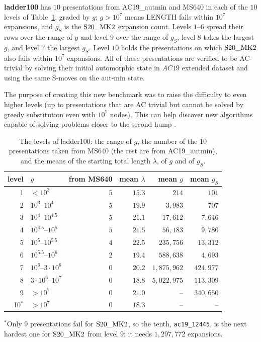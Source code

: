 \begin{definition}[ladder100]\label{def:ladder}\label{def:levels}
\textbf{ladder100} has $10$ presentations from AC19\_autmin and MS640 in each of the $10$ levels of Table~\ref{tab:ladder}, graded by $g$; $g>10^7$ means LENGTH fails within $10^7$ expansions, and $g_S$ is the $\mathrm{S20\_MK2}$
expansion count. Levels $1$--$6$ spread their rows over the range of $g$ and level $9$ over the range of $g_S$, level $8$ takes the
largest $g$, and level $7$ the largest $g_S$. Level $10$ holds the presentations on which $\mathrm{S20\_MK2}$ also fails within $10^7$ expansions. All of these presentations are verified to be AC-trivial by solving their initial automorphic state in $AC19$ extended dataset and using the same S-moves on the aut-min state.

The purpose of creating this new benchmark was to raise the difficulty to even higher levels (up to presentations that are AC trivial but cannot be solved by greedy substitution even with $10^{7}$ nodes). This can help discover new algorithms capable of solving problems closer to the second hump \cite{FTS26}.

\end{definition}

\begin{table}[ht]
\centering
\begin{tabular}{rlrrrr}
\toprule
level & $g$ & from MS640 & mean $\lambda$ & mean $g$ & mean $g_S$\\
\midrule
1 & $<10^3$ & $5$ & $15.3$ & $214$ & $101$\\
2 & $10^3$--$10^4$ & $5$ & $19.9$ & $3{,}983$ & $707$\\
3 & $10^4$--$10^{4.5}$ & $5$ & $21.1$ & $17{,}612$ & $7{,}646$\\
4 & $10^{4.5}$--$10^5$ & $5$ & $21.5$ & $56{,}183$ & $9{,}780$\\
5 & $10^5$--$10^{5.5}$ & $4$ & $22.5$ & $235{,}756$ & $13{,}312$\\
6 & $10^{5.5}$--$10^6$ & $2$ & $19.4$ & $588{,}638$ & $4{,}693$\\
7 & $10^6$--$3\cdot10^6$ & $0$ & $20.2$ & $1{,}875{,}962$ & $424{,}977$\\
8 & $3\cdot10^6$--$10^7$ & $0$ & $18.8$ & $5{,}022{,}975$ & $113{,}309$\\
9 & $>10^7$ & $0$ & $21.0$ & -- & $340{,}650$\\
10$^{*}$ & $>10^7$ & $0$ & $18.3$ & -- & --\\
\bottomrule
\end{tabular}

\smallskip
{\small $^{*}$Only $9$ presentations fail for $\mathrm{S20\_MK2}$, so the tenth, \texttt{ac19\_12445}, is the next hardest one for
$\mathrm{S20\_MK2}$ from level $9$: it needs $1{,}297{,}772$ expansions.}
\caption{The levels of ladder100: the range of $g$, the number of the $10$ presentations taken from MS640 (the rest
are from AC19\_autmin), and the means of the starting total length $\lambda$, of $g$ and of $g_S$.}
\label{tab:ladder}
\end{table}
